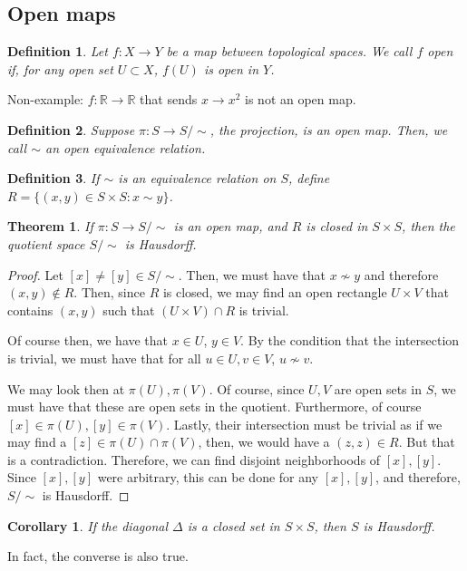 \documentclass[10pt]{article}
\newtheorem{definition}{Definition}[section]
\newtheorem{theorem}{Theorem}[section]
\newtheorem{corollary}{Corollary}[section]
\begin{document}
\subsection{Open maps}

\begin{definition}
Let $f : X \to Y$ be a map between topological spaces. We call $f$ open if, for any open set $U \subset X$, $f(U)$ is open in $Y$.
\end{definition}

Non-example: $f: \mathbb{R} \to \mathbb{R}$ that sends $x \to x^2$ is not an open map.

\begin{definition}
Suppose $\pi: S \to S/\sim$, the projection, is an open map. Then, we call $\sim$ an open equivalence relation.
\end{definition}

\begin{definition}
If $\sim$ is an equivalence relation on $S$, define $R = \{ (x,y) \in S \times S : x \sim y \}$.
\end{definition}

\begin{theorem}
If $\pi: S \to S/\sim$ is an open map, and $R$ is closed in $S \times S$, then the quotient space $S/\sim$ is Hausdorff.
\end{theorem}

\begin{proof}
Let $[x] \not = [y] \in S/\sim$. Then, we must have that $x \not \sim y$ and therefore $(x,y) \not \in R$. Then, since $R$ is closed, we may find an open rectangle $U \times V$ that contains $(x,y)$ such that $(U \times V) \cap R$ is trivial.

Of course then, we have that $x \in U$, $y \in V$. By the condition that the intersection is trivial, we must have that for all $u \in U, v \in V$, $u \not \sim v$.

We may look then at $\pi(U), \pi(V)$. Of course, since $U, V$ are open sets in $S$, we must have that these are open sets in the quotient. Furthermore, of course $[x] \in \pi(U), [y] \in \pi(V)$. Lastly, their intersection must be trivial as if we may find a $[z] \in \pi(U) \cap \pi(V)$, then, we would have a $(z,z) \in R$. But that is a contradiction. Therefore, we can find disjoint neighborhoods of $[x], [y]$. Since $[x], [y]$ were arbitrary, this can be done for any $[x],[y]$, and therefore, $S/\sim$ is Hausdorff.
\end{proof}

\begin{corollary}
If the diagonal $\Delta$ is a closed set in $S \times S$, then $S$ is Hausdorff. 
\end{corollary}

In fact, the converse is also true.
\end{document}
